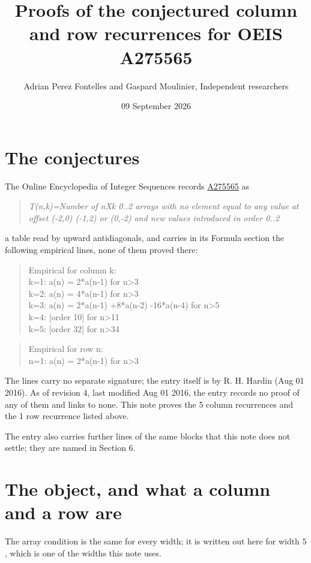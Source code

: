 \documentclass[11pt]{article}
\title{Proofs of the conjectured column and row recurrences for OEIS A275565}
\author{Adrian Perez Fontelles and Gaspard Moulinier, Independent researchers}
\date{09 September 2026}
\theoremstyle{definition}
\begin{document}
\maketitle
\section{The conjectures}

The Online Encyclopedia of Integer Sequences records \href{https://oeis.org/A275565}{A275565} as

\begin{quote}\itshape T(n,k)=Number of nXk 0..2 arrays with no element equal to any value at offset (-2,0) (-1,2) or (0,-2) and new values introduced in order 0..2\end{quote}

a table read by upward antidiagonals, and carries in its Formula section the following empirical lines, none of them proved there:

\begin{quote}\ttfamily Empirical for column k:\\
k=1: a(n) = 2*a(n-1) for n>3\\k=2: a(n) = 4*a(n-1) for n>3\\k=3: a(n) = 2*a(n-1) +8*a(n-2) -16*a(n-4) for n>5\\k=4: [order 10] for n>11\\k=5: [order 32] for n>34\end{quote}

\begin{quote}\ttfamily Empirical for row n:\\
n=1: a(n) = 2*a(n-1) for n>3\end{quote}

The lines carry no separate signature; the entry itself is by R. H. Hardin (Aug 01 2016). As of revision 4, last modified Aug 01 2016, the entry records no proof of any of them and links to none. This note proves the 5 column recurrences and the 1 row recurrence listed above.

The entry also carries further lines of the same blocks that this note does not settle; they are named in Section 6.

\section{The object, and what a column and a row are}

The array condition is the same for every width; it is written out here for width $5$, which is one of the widths this note uses.
\end{document}
